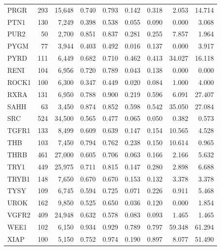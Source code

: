 \begin{center}
\begin{longtable}{@{}lrrrrrrrr@{}}
    PRGR   & 293   & 15,648   & 0.740   & 0.793   & 0.142   & 0.318   & 2.053   & 14.714 \\
    PTN1   & 130   & 7,249    & 0.398   & 0.538   & 0.055   & 0.090   & 0.000   & 3.068  \\
    PUR2   & 50    & 2,700    & 0.851   & 0.837   & 0.281   & 0.255   & 7.857   & 1.964  \\
    PYGM   & 77    & 3,944    & 0.403   & 0.492   & 0.016   & 0.137   & 0.000   & 3.917  \\
    PYRD   & 111   & 6,449    & 0.682   & 0.710   & 0.462   & 0.413   & 34.027  & 16.118 \\
    RENI   & 104   & 6,956    & 0.720   & 0.789   & 0.043   & 0.138   & 0.000   & 0.000  \\
    ROCK1  & 100   & 6,300    & 0.347   & 0.449   & 0.020   & 0.084   & 1.000   & 4.000  \\
    RXRA   & 131   & 6,950    & 0.788   & 0.900   & 0.219   & 0.596   & 6.091   & 27.407 \\
    SAHH   & 63    & 3,450    & 0.874   & 0.852   & 0.598   & 0.542   & 35.050  & 27.084 \\
    SRC    & 524   & 34,500   & 0.565   & 0.477   & 0.065   & 0.050   & 0.382   & 0.573  \\
    TGFR1  & 133   & 8,499    & 0.609   & 0.639   & 0.147   & 0.154   & 10.565  & 4.528  \\
    THB    & 103   & 7,450    & 0.794   & 0.762   & 0.238   & 0.150   & 10.614  & 0.965  \\
    THRB   & 461   & 27,000   & 0.605   & 0.706   & 0.063   & 0.166   & 2.166   & 5.632  \\
    TRY1   & 449   & 25,975   & 0.711   & 0.815   & 0.147   & 0.280   & 2.898   & 6.688  \\
    TRYB1  & 148   & 7,650    & 0.670   & 0.670   & 0.153   & 0.132   & 3.378   & 3.378  \\
    TYSY   & 109   & 6,745    & 0.594   & 0.725   & 0.071   & 0.226   & 0.911   & 5.468  \\
    UROK   & 162   & 9,850    & 0.525   & 0.650   & 0.036   & 0.120   & 0.000   & 1.854  \\
    VGFR2  & 409   & 24,948   & 0.632   & 0.578   & 0.083   & 0.093   & 1.465   & 1.465  \\
    WEE1   & 102   & 6,150    & 0.934   & 0.929   & 0.789   & 0.797   & 59.348  & 61.294 \\
    XIAP   & 100   & 5,150    & 0.752   & 0.974   & 0.190   & 0.897   & 8.077   & 51.490 \\
    \bottomrule
  \end{longtable}

  \endgroup
\end{center}


